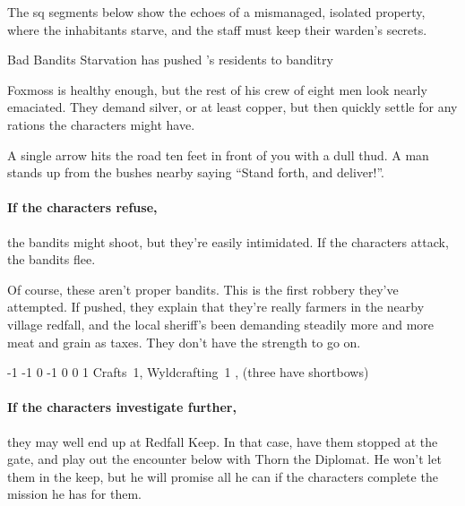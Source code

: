The \gls{sq} \glspl{segment} below show the echoes of a mismanaged, isolated property, where the inhabitants starve, and the staff must keep their \gls{warden}'s secrets.

{Bad Bandits}%
{Starvation has pushed 's residents to banditry}%

Foxmoss is healthy enough, but the rest of his crew of eight men look nearly emaciated.
They demand silver, or at least copper, but then quickly settle for any rations the characters might have.

\begin{boxtext}

  A single arrow hits the road ten feet in front of you with a dull thud.
  A man stands up from the bushes nearby saying ``Stand forth, and deliver!''.

\end{boxtext}

\paragraph{If the characters refuse,}
the bandits might shoot, but they're easily intimidated.  If the characters attack, the bandits flee.

Of course, these aren't proper bandits.
This is the first robbery they've attempted.
If pushed, they explain that they're really farmers in the nearby village \gls{redfall}, and the local sheriff's been demanding steadily more and more meat and grain as taxes.
They don't have the strength to go on.


  {-1}%
  {-1}%
  {{0}%
  {-1}%
  {0}}%
  {0}%
  {1}%
  {Crafts~1, Wyldcrafting~1}%
  {\Dagger, (three have shortbows)}%
  {}

\paragraph{If the characters investigate further,}
they may well end up at Redfall Keep.
In that case, have them stopped at the gate, and play out the encounter below with Thorn the Diplomat.
He won't let them in the keep, but he will promise all he can if the characters complete the mission he has for them.

